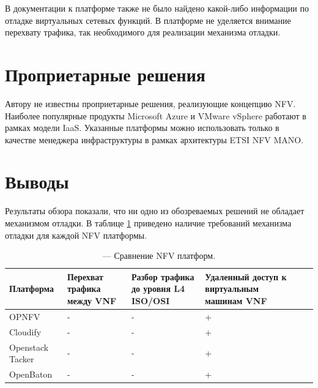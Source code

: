 \documentclass[oneside,final,14pt,a4paper]{extreport}
\begin{document}
В документации к платформе также не было найдено какой-либо информации по отладке виртуальных сетевых функций. В платформе не уделяется внимание перехвату трафика, так необходимого для реализации механизма отладки.


\section{Проприетарные решения}
Автору не известны проприетарные решения, реализующие концепцию NFV. Наиболее популярные продукты Microsoft Azure и VMware vSphere работают в рамках модели IaaS. Указанные платформы можно использовать только в качестве менеджера инфраструктуры в рамках архитектуры ETSI NFV MANO.


\section{Выводы}
Результаты обзора показали, что ни одно из обозреваемых решений не обладает механизмом отладки. В таблице \ref{tab:nfv_platform_comprassion} приведено наличие требований механизма отладки для каждой NFV платформы.

\renewcommand{\arraystretch}{1.5}
\begin{table}[h]
\center %
\begin{tabular}{|p{}|p{}|p{}|p{}|p{}|p{}|} %
\hline %
Плат\-фор\-ма & Перехват трафика между VNF & Разбор трафика до уровня L4 ISO/OSI & Удаленный доступ к виртуальным машинам VNF \\
\hline
OPNFV & - & - & + \\
\hline
Cloudify & - & - & + \\
\hline
Openstack Tacker & - & - & + \\
\hline
OpenBaton & - & - & + \\
\hline
\end{tabular}
\caption{--- Сравнение NFV платформ.}
\label{tab:nfv_platform_comprassion}
\end{table}
\end{document}
